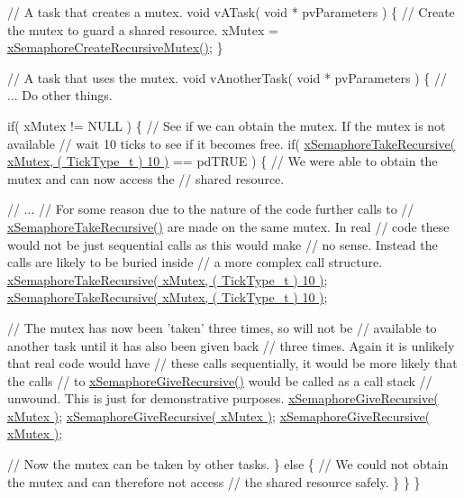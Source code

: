 \begin{DoxyPre}// A task that creates a mutex.
void vATask( void * pvParameters )
\{
   // Create the mutex to guard a shared resource.
   xMutex = \hyperlink{semphr_8h_a1bbc843be5a41ea83d2693b2189fc0f8}{xSemaphoreCreateRecursiveMutex()};
\}\end{DoxyPre}



\begin{DoxyPre}// A task that uses the mutex.
void vAnotherTask( void * pvParameters )
\{
   // ... Do other things.\end{DoxyPre}



\begin{DoxyPre}   if( xMutex != NULL )
   \{
       // See if we can obtain the mutex.  If the mutex is not available
       // wait 10 ticks to see if it becomes free.
       if( \hyperlink{semphr_8h_ad395f4bba51eea6af3397d72bc079e4d}{xSemaphoreTakeRecursive( xMutex, ( TickType\_t ) 10 )} == pdTRUE )
       \{
           // We were able to obtain the mutex and can now access the
           // shared resource.\end{DoxyPre}



\begin{DoxyPre}           // ...
           // For some reason due to the nature of the code further calls to
        // \hyperlink{semphr_8h_ad395f4bba51eea6af3397d72bc079e4d}{xSemaphoreTakeRecursive()} are made on the same mutex.  In real
        // code these would not be just sequential calls as this would make
        // no sense.  Instead the calls are likely to be buried inside
        // a more complex call structure.
           \hyperlink{semphr_8h_ad395f4bba51eea6af3397d72bc079e4d}{xSemaphoreTakeRecursive( xMutex, ( TickType\_t ) 10 )};
           \hyperlink{semphr_8h_ad395f4bba51eea6af3397d72bc079e4d}{xSemaphoreTakeRecursive( xMutex, ( TickType\_t ) 10 )};\end{DoxyPre}



\begin{DoxyPre}           // The mutex has now been 'taken' three times, so will not be
        // available to another task until it has also been given back
        // three times.  Again it is unlikely that real code would have
        // these calls sequentially, it would be more likely that the calls
        // to \hyperlink{semphr_8h_a398d66b17856c22dd49d39aaac42f105}{xSemaphoreGiveRecursive()} would be called as a call stack
        // unwound.  This is just for demonstrative purposes.
           \hyperlink{semphr_8h_a398d66b17856c22dd49d39aaac42f105}{xSemaphoreGiveRecursive( xMutex )};
        \hyperlink{semphr_8h_a398d66b17856c22dd49d39aaac42f105}{xSemaphoreGiveRecursive( xMutex )};
        \hyperlink{semphr_8h_a398d66b17856c22dd49d39aaac42f105}{xSemaphoreGiveRecursive( xMutex )};\end{DoxyPre}



\begin{DoxyPre}        // Now the mutex can be taken by other tasks.
       \}
       else
       \{
           // We could not obtain the mutex and can therefore not access
           // the shared resource safely.
       \}
   \}
\}
\end{DoxyPre}
 